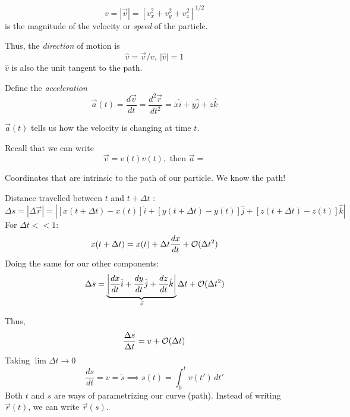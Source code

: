 \begin{definition}
\[v = |\vec{v}| = [v_x^2 + v_y^2 + v_z^2]^{1/2}\]
is the magnitude of the velocity or \emph{speed} of the particle.

Thus, the \emph{direction} of motion is 
\[\hat{v} = \vec{v}/v,~ |\hat{v}| = 1\]
$\hat{v}$ is also the unit tangent to the path.

Define the \emph{acceleration}
\[\vec{a}(t) = \frac{d\vec{v}}{dt} = \frac{d^2\vec{r}}{dt^2} = \ddot{x}\hat{i} + \ddot{y}\hat{j} + \ddot{z}\hat{k}\]
\end{definition}

$\vec{a}(t)$ tells us how the velocity is changing at time $t$. 

Recall that we can write 
\[\vec{v} = v(t)\hat{v}(t), \text{ then } \vec{a} = \]

\pagebreak




Coordinates that are intrinsic to the path of our particle. We know the path!
\vspace*{120pt}

Distance travelled between $t$ and $t + \Delta t$
:
\[\Delta s = |\Delta \vec{r}| = \left|[x(t + \Delta t) - x(t)]\hat{i} + [y(t + \Delta t) - y(t)]\hat{j} + [z(t + \Delta t) - z(t)]\hat{k}\right|\]
For $\Delta t << 1$: 
\[x(t + \Delta t) = x(t) + \Delta t \frac{dx}{dt} + \cal{O}(\Delta t^2)\]
Doing the same for our other components:
\[\Delta s = \underbrace{\left|\frac{dx}{dt}\hat{i} + \frac{dy}{dt}\hat{j} + \frac{dz}{dt}\hat{k}\right|}_{\vec{v}}\Delta t + \cal{O}(\Delta t^2)\]

Thus,
\[\frac{\Delta s}{\Delta t} = v + \cal{O}(\Delta t)\]
Taking $\lim \Delta t \to 0$
\[\boxed{\frac{ds}{dt} = v = \dot{s} \implies s(t) = \int_0^t v(t')\,dt'}\]
Both $t$ and $s$ are ways of parametrizing our curve (path). Instead of writing $\vec{r}(t)$, we can write $\vec{r}(s)$. \\

